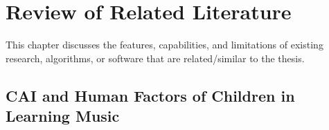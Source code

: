 %
%
%                 

\chapter{Review of Related Literature}
This chapter discusses the features, capabilities, and limitations of existing research, algorithms, or software 
that are related/similar to the thesis.

\section{CAI and Human Factors of Children in Learning Music}

